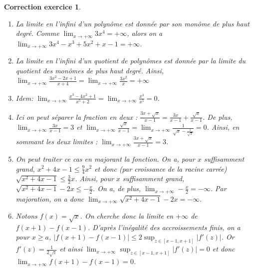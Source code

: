 \documentclass[12pt]{article}
\newtheorem{correction}{\bf Correction exercice}
\newenvironment{cor}{
\begin{correction}\smallskip\normalfont}{\end{correction}
}
\newif\ifcorrige\corrigetrue
\begin{document}
\ifcorrige
\color{magenta}
\begin{cor}
$\qquad$
\begin{enumerate}
\item La limite en l'infini d'un polyn\^ome est donn\'ee par son mon\^ome de plus haut degr\'e.
  Comme $\lim_{x \to + \infty} 3x^4 = + \infty$,
  alors on a $\lim_{x \to + \infty} 3x^4  - x^3 + 5x^2 + x - 1= + \infty$.

\item La limite en l'infini d'un quotient de polyn\^omes est donn\'ee par la limite
  du quotient des mon\^omes de plus haut degr\'e.
  Ainsi, $\lim_{x \to +\infty}\frac{3x^2-2x+1}{x+4} = \lim_{x \to +\infty}\frac{3x^2}{x} = + \infty$

\item Idem:
  $\lim_{x \to + \infty} \frac{x^3-4x^2+1}{x^5+2} = \lim_{x \to + \infty} \frac{x^3}{x^5} = 0$.

\item Ici on peut s\'eparer la fraction en deux :
  $\frac{3x+\sqrt{x}}{x-1} = \frac{3x}{x-1} + \frac{\sqrt{x}}{x-1}$.
  De plus, $\lim_{x \to + \infty}\frac{3x}{x-1} = 3$
  et $\lim_{x \to + \infty}\frac{\sqrt{x}}{x-1}
  = \lim_{x \to + \infty}\frac{1}{\sqrt{x}-\frac1{\sqrt{x}}} = 0$.
  Ainsi, en sommant les deux limites : $\lim_{x \to +\infty}\frac{3x+\sqrt{x}}{x-1} = 3$.

\item On peut traiter ce cas en majorant la fonction.
  On a, pour $x$ suffisamment grand, $x^2 + 4x - 1 \leq \frac94 x^2$ et donc
  (par croissance de la racine carr\'ee)
  $\sqrt{x^2 + 4x - 1} \leq \frac32 x$.
  Ainsi, pour $x$ suffisamment grand, $\sqrt{x^2 + 4x - 1} - 2x \leq - \frac{x}2$.
  On a, de plus, $\lim_{x \to +\infty} - \frac{x}2 = -\infty$.
  Par majoration, on a donc $\lim_{x \to +\infty} \sqrt{x^2 + 4x - 1} - 2x = -\infty$.

\item Notons $f(x) = \sqrt{x}$.
  On cherche donc la limite en $+\infty$ de $f(x+1) - f(x-1)$.
  D'apr\`es l'in\'egalit\'e des accroissements finis,
  on a pour $x \geq a$, $| f(x+1) - f(x-1) | \leq 2 \sup_{z \in [x-1, x+1]} |f'(z)|$.
  Or $f'(z) = \frac{1}{2\sqrt{z}}$ et ainsi $\lim_{x \to +\infty} \sup_{z \in [x-1, x+1]} |f'(z)| = 0$
  et donc $\lim_{x \to +\infty} f(x+1) - f(x-1) = 0$.
  
\end{enumerate}
\end{cor}
\color{black}
\fi

\end{document}
